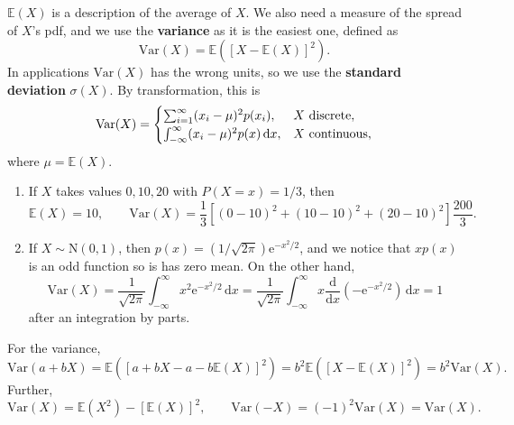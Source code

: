 \documentclass[letter-paper]{tufte-book}
\newenvironment{example}[1][Example]{\begin{trivlist}
\item[\hskip \labelsep {\bfseries #1}]}{\end{trivlist}}
\newcommand{\ex}{\mathrm{e}}
\newcommand\Def[1]{\textbf{#1}}
\begin{document}
$\mathbb{E}(X)$ is a description of the average of $X$. We also need a measure
of the spread of $X$'s pdf, and we use the \Def{variance} as it is the
easiest one, defined as
\begin{equation*}
  \mbox{Var}(X) = \mathbb{E}\left([X-\mathbb{E}(X)]^2\right).
\end{equation*}
In applications $\mbox{Var}(X)$ has the wrong units, so we use the
\Def{standard deviation} $\sigma(X)$. By transformation, this is
\begin{equation*}
  \mbox{Var}(X) =
    \begin{cases}
      \sum_{i=1}^\infty (x_i - \mu)^2 p(x_i), & X\ \textnormal{discrete},\\
      \int_{-\infty}^\infty (x_i - \mu)^2 p(x)\, \mathrm{d}x, &
        X\ \textnormal{continuous},
    \end{cases}
\end{equation*}
where $\mu = \mathbb{E}(X)$.

\begin{example}
  \begin{enumerate}
    \item If $X$ takes values $0,10,20$ with $P(X=x) = 1/3$, then
    \begin{equation*}
      \mathbb{E}(X) = 10,\qquad 
      \mbox{Var}(X) = \frac{1}{3}[(0 - 10)^2 + (10 - 10)^2 + (20 - 10)^2]
        \frac{200}{3}.
    \end{equation*}
    
    \item If $X\sim\mbox{N}(0,1)$, then $p(x) = (1/\sqrt{2\pi})\ex^{-x^2/2}$,
    and we notice that $x p(x)$ is an odd function so is has zero mean. On the
    other hand,
    \begin{equation*}
     \mbox{Var}(X) 
      = \frac{1}{\sqrt{2\pi}} \int_{-\infty}^\infty 
        x^2 \ex^{-x^2/2}\, \mathrm{d}x 
      = \frac{1}{\sqrt{2\pi}} \int_{-\infty}^\infty
        x\frac{\mathrm{d}}{\mathrm{d}x}\left(-\ex^{-x^2/2}\right)\, \mathrm{d}x 
      = 1
    \end{equation*}
    after an integration by parts.
  \end{enumerate}
\end{example}

For the variance,
\begin{equation*}
  \mbox{Var}(a+bX) = \mathbb{E}([a+bX - a-b\mathbb{E}(X)]^2) =
    b^2\mathbb{E}([X-\mathbb{E}(X)]^2) = b^2\mbox{Var}(X).
\end{equation*}
Further,
\begin{equation*}
  \mbox{Var}(X) = \mathbb{E}(X^2) - [\mathbb{E}(X)]^2,\qquad
  \mbox{Var}(-X) = (-1)^2 \mbox{Var}(X) = \mbox{Var}(X).
\end{equation*}
\end{document}
